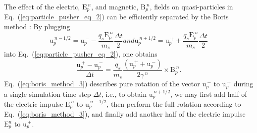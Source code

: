 \documentclass[10pt, a4paper, twoside, openright]{report}
\renewcommand{\vec}[1]{\boldsymbol{\mathrm{#1}}}
\begin{document}
The effect of the electric, $ \vec{E}_{p}^{\:n} $, and magnetic, $ \vec{B}_{p}^{\:n} $, fields on quasi-particles in Eq.~(\ref{eq:particle_pusher_eq_2}) can be efficiently separated by the Boris method \cite{Boris1970}: By plugging
\begin{subequations}
\begin{equation}\label{eq:boris_method_1}
	\vec{u}_{p}^{\:n-1/2} = \vec{u}_{p}^{\:-} - \frac{q_{s} \vec{E}_{p}^{\:n}}{m_{s}} \frac{\Delta t}{2}
\end{equation}
and
\begin{equation}\label{eq:boris_method_2}
	\vec{u}_{p}^{\:n+1/2} = \vec{u}_{p}^{\:+} + \frac{q_{s} \vec{E}_{p}^{\:n}}{m_{s}} \frac{\Delta t}{2}
\end{equation}
\end{subequations}
into Eq.~(\ref{eq:particle_pusher_eq_2}), one obtains
\begin{equation}\label{eq:boris_method_3}
	\frac{\vec{u}_{p}^{\:+} - \vec{u}_{p}^{\:-}}{\Delta t} = \frac{q_{s}}{m_{s}} \frac{\left( \vec{u}_{p}^{\:+} + \vec{u}_{p}^{\:-} \right)}{2 \gamma^{\:n} } \times \vec{B}_{p}^{\:n}. 
\end{equation}
Eq.~(\ref{eq:boris_method_3}) describes pure rotation of the vector $ \vec{u}_{p}^{\:-} $ to $ \vec{u}_{p}^{\:+} $ during a single simulation time step $ \Delta t $, i.e., to obtain $ \vec{u}_{p}^{\:n+1/2} $, we may first add half of the electric impulse $ \vec{E}_{p}^{\:n} $ to $ \vec{u}_{p}^{\:n-1/2} $, then perform the full rotation according to Eq.~(\ref{eq:boris_method_3}), and finally add another half of the electric impulse $ \vec{E}_{p}^{n} $ to $ \vec{u}_{p}^{\:+} $.
\end{document}
